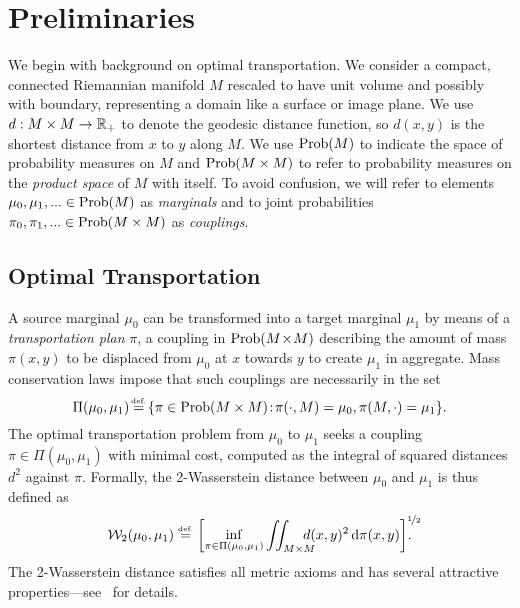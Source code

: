 \section{Preliminaries}


We begin with background on optimal transportation. We consider a compact, connected Riemannian manifold $M$ rescaled to have unit volume and possibly with boundary, representing a domain like a surface or image plane.  We use $d:M\times M\rightarrow\mathbb{R}_+$ to denote the geodesic distance function, so $d(x,y)$ is the shortest distance from $x$ to $y$ along $M$.  We use $\mathrm{Prob}(M)$ to indicate the space of probability measures on $M$ and $\mathrm{Prob}(M\times M)$ to refer to probability measures on the \emph{product space} of $M$ with itself. To avoid confusion, we will refer to elements $\mu_0,\mu_1,...\in \mathrm{Prob}(M)$ as \emph{marginals} and to joint probabilities $\pi_0,\pi_1,...\in \mathrm{Prob}(M\times M)$ as \emph{couplings}.


\subsection{Optimal Transportation}

A source marginal $\mu_0$ can be transformed into a target marginal $\mu_1$ by means of a \emph{transportation plan} $\pi$, a coupling in $\mathrm{Prob}(M\!\times\!M)$ describing the amount of mass $\pi(x,y)$ to be displaced from $\mu_0$ at $x$ towards $y$ to create $\mu_1$ in aggregate. Mass conservation laws impose that such couplings are necessarily in the set
$$
\Pi(\mu_0,\mu_1) \!\eqdef\!  \{ \pi \in \Prob(M \times M) \!:\! \pi(\cdot,M)  =  \mu_0, \pi(M,\cdot)  =  \mu_1 \}.
$$
%
The optimal transportation problem from $\mu_0$ to $\mu_1$ seeks a coupling $\pi\in\Pi(\mu_0,\mu_1)$ with minimal cost, computed as the integral of squared distances $d^2$ against $\pi$. Formally, the 2-Wasserstein distance between $\mu_0$ and $\mu_1$ is thus defined as
\begin{equation}
\label{eq:WassersteinDistance}
\W_2(\mu_0,\mu_1) \eqdef \left[\inf_{\pi\in\Pi(\mu_0,\mu_1)} \iint_{M\times M}\hspace{-.15in} d(x,y)^2\, \drm\pi(x,y)\right]^{\nicefrac{1}{2}}\hspace{-4mm}.
\end{equation}
The 2-Wasserstein distance satisfies all metric axioms and has several attractive properties---see~\cite[\S7]{villani-2003} for details.

